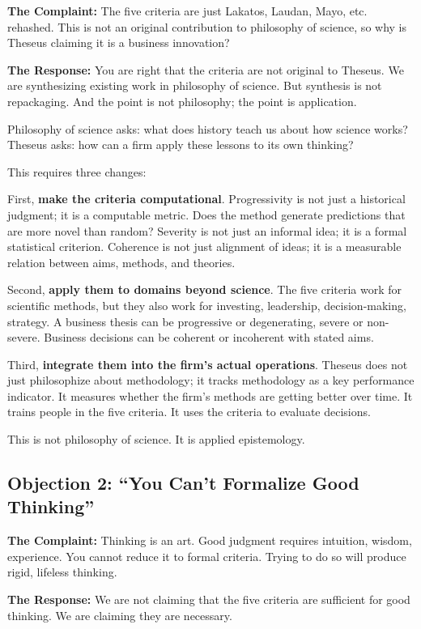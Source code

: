 \documentclass[11pt,letterpaper]{article}
\begin{document}
\textbf{The Complaint:} The five criteria are just Lakatos, Laudan, Mayo, etc. rehashed. This is not an original contribution to philosophy of science, so why is Theseus claiming it is a business innovation?

\textbf{The Response:} You are right that the criteria are not original to Theseus. We are synthesizing existing work in philosophy of science. But synthesis is not repackaging. And the point is not philosophy; the point is application.

Philosophy of science asks: what does history teach us about how science works? Theseus asks: how can a firm apply these lessons to its own thinking?

This requires three changes:

First, \textbf{make the criteria computational}. Progressivity is not just a historical judgment; it is a computable metric. Does the method generate predictions that are more novel than random? Severity is not just an informal idea; it is a formal statistical criterion. Coherence is not just alignment of ideas; it is a measurable relation between aims, methods, and theories.

Second, \textbf{apply them to domains beyond science}. The five criteria work for scientific methods, but they also work for investing, leadership, decision-making, strategy. A business thesis can be progressive or degenerating, severe or non-severe. Business decisions can be coherent or incoherent with stated aims.

Third, \textbf{integrate them into the firm's actual operations}. Theseus does not just philosophize about methodology; it tracks methodology as a key performance indicator. It measures whether the firm's methods are getting better over time. It trains people in the five criteria. It uses the criteria to evaluate decisions.

This is not philosophy of science. It is applied epistemology.

\subsection*{Objection 2: ``You Can't Formalize Good Thinking''}

\textbf{The Complaint:} Thinking is an art. Good judgment requires intuition, wisdom, experience. You cannot reduce it to formal criteria. Trying to do so will produce rigid, lifeless thinking.

\textbf{The Response:} We are not claiming that the five criteria are sufficient for good thinking. We are claiming they are necessary.
\end{document}
